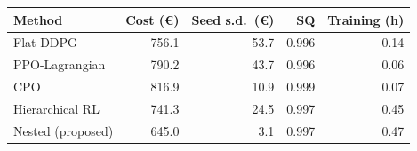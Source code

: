 \begin{tabular}{@{}lrrrr@{}}
\toprule
Method & Cost (\euro) & Seed s.d.\ (\euro) & SQ & Training (h) \\
\midrule
Flat DDPG & 756.1 & 53.7 & 0.996 & 0.14 \\
PPO-Lagrangian & 790.2 & 43.7 & 0.996 & 0.06 \\
CPO & 816.9 & 10.9 & 0.999 & 0.07 \\
Hierarchical RL & 741.3 & 24.5 & 0.997 & 0.45 \\
Nested (proposed) & 645.0 & 3.1 & 0.997 & 0.47 \\
\bottomrule
\end{tabular}
